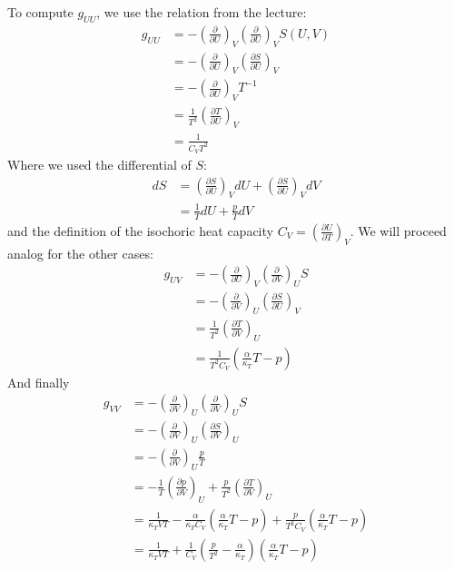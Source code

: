\documentclass[a4paper]{article}
\newcommand{\pd}[3]{\left(\frac{\partial {#1}}{\partial {#2}}\right)_{#3}}
\begin{document}
To compute $g_{UU}$, we use the relation from the lecture:
\begin{align}
    g_{UU}&=-\pd{}{U}{V}\pd{}{U}{V} S(U,V) \\
          &=-\pd{}{U}{V}\pd{S}{U}{V} \\
          &=-\pd{}{U}{V}T^{-1} \\
          &=\frac{1}{T^2}\pd{T}{U}{V} \\
          &=\frac{1}{C_VT^2}
\end{align}
Where we used the differential of $S$:
\begin{align}
    dS&=\pd{S}{U}{V}dU+\pd{S}{U}{V}dV \\
    &=\frac{1}{T}dU+\frac{p}{T}dV
\end{align}
and the definition of the isochoric heat capacity $C_V=\pd{U}{T}{V}$.
We will proceed analog for the other cases:
\begin{align}
    g_{UV}&=-\pd{}{U}{V}\pd{}{V}{U}S \\
          &=-\pd{}{V}{U}\pd{S}{U}{V} \\
          &=\frac{1}{T^2}\pd{T}{V}{U} \\
          &=\frac{1}{T^2C_V}\left( \frac{\alpha}{\kappa_T}T-p  \right)
\end{align}
And finally
\begin{align}
    g_{VV}&=-\pd{}{V}{U}\pd{}{V}{U}S \\
          &=-\pd{}{V}{U}\pd{S}{V}{U} \\
          &=-\pd{}{V}{U}\frac{p}{T} \\
          &=-\frac{1}{T}\pd{p}{V}{U}+\frac{p}{T^2}\pd{T}{V}{U} \\
          &=\frac{1}{\kappa_TVT}-\frac{\alpha}{\kappa_TC_V}\left( \frac{\alpha}{\kappa_T}T-p  \right)+\frac{p}{T^2C_V}\left( \frac{\alpha}{\kappa_T}T-p  \right) \\
          &=\frac{1}{\kappa_TVT}+\frac{1}{C_V}\left( \frac{p}{T^2}-\frac{\alpha}{\kappa_T} \right)\left( \frac{\alpha}{\kappa_T}T-p  \right)
\end{align}
\end{document}
